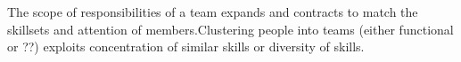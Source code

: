 The scope of responsibilities of a team expands and contracts to match the skillsets and attention of members.Clustering people into teams (either functional or ??) exploits concentration of similar skills or diversity of skills.